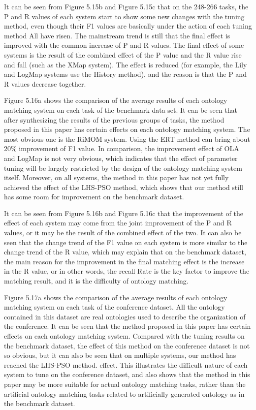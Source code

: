 \documentclass[twoside]{article}
\begin{document}
\begin{multicols}{2}
It can be seen from Figure 5.15b and Figure 5.15c that on the 248-266 tasks, the P and R values of each system start to show some new changes with the tuning method, even though their F1 values are basically under the action of each tuning method All have risen. 
The mainstream trend is still that the final effect is improved with the common increase of P and R values. The final effect of some systems is the result of the combined effect of the P value and the R value rise and fall (such as the XMap system). The effect is reduced (for example, the Lily and LogMap systems use the History method), and the reason is that the P and R values decrease together.

Figure 5.16a shows the comparison of the average results of each ontology matching system on each task of the benchmark data set. It can be seen that after synthesizing the results of the previous groups of tasks, the method proposed in this paper has certain effects on each ontology matching system. The most obvious one is the RiMOM system. Using the ERT method can bring about 20\% improvement of F1 value. 
In comparison, the improvement effect of OLA and LogMap is not very obvious, which indicates that the effect of parameter tuning will be largely restricted by the design of the ontology matching system itself. 
Moreover, on all systems, the method in this paper has not yet fully achieved the effect of the LHS-PSO method, which shows that our method still has some room for improvement on the benchmark dataset.

It can be seen from Figure 5.16b and Figure 5.16c that the improvement of the effect of each system may come from the joint improvement of the P and R values, or it may be the result of the combined effect of the two. 
It can also be seen that the change trend of the F1 value on each system is more similar to the change trend of the R value, which may explain that on the benchmark dataset, the main reason for the improvement in the final matching effect is the increase in the R value, or in other words, the recall Rate is the key factor to improve the matching result, and it is the difficulty of ontology matching.

Figure 5.17a shows the comparison of the average results of each ontology matching system on each task of the conference dataset. 
All the ontology contained in this dataset are real ontologies used to describe the organization of the conference. 
It can be seen that the method proposed in this paper has certain effects on each ontology matching system. 
Compared with the tuning results on the benchmark dataset, the effect of this method on the conference dataset is not so obvious, but it can also be seen that on multiple systems, our method has reached the LHS-PSO method. effect. 
This illustrates the difficult nature of each system to tune on the conference dataset, and also shows that the method in this paper may be more suitable for actual ontology matching tasks, rather than the artificial ontology matching tasks related to artificially generated ontology as in the benchmark dataset.


\end{multicols}
\end{document}
